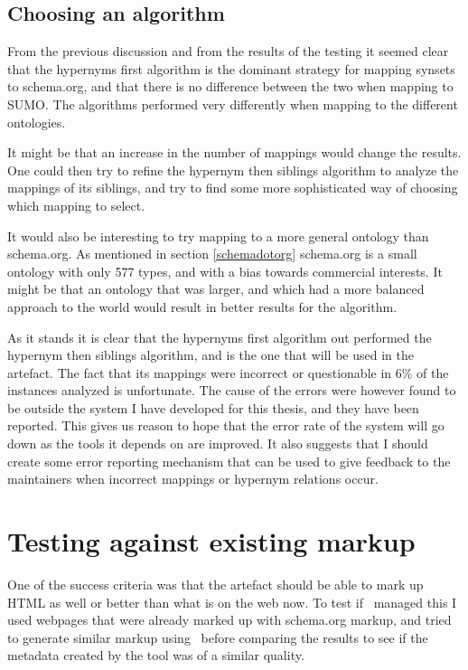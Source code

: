 \subsection{Choosing an algorithm}
From the previous discussion and from the results of the testing it seemed clear that the hypernyms first algorithm is
the dominant strategy for mapping synsets to schema.org, and that there is no difference between the two when mapping to SUMO.
The algorithms performed very differently when mapping to the different ontologies.

It might be that an increase in the number of mappings would change the results.
One could then try to refine the hypernym then siblings algorithm to analyze the mappings of its siblings,
and try to find some more sophisticated way of choosing which mapping to select.

It would also be interesting to try mapping to a more general ontology than schema.org.
As mentioned in section \ref{schemadotorg} schema.org is a small ontology with only 577 types,
and with a bias towards commercial interests.
It might be that an ontology that was larger,
and which had a more balanced approach to the world would result in better results for the algorithm.

As it stands it is clear that the hypernyms first algorithm out performed the hypernym then siblings algorithm,
and is the one that will be used in the artefact.
The fact that its mappings were incorrect or questionable in 6\% of the instances analyzed is unfortunate.
The cause of the errors were however found to be outside the system I have developed for this thesis,
and they have been reported.
This gives us reason to hope that the error rate of the system will go down as the tools it depends on are improved.
It also suggests that I should create some error reporting mechanism that can be used to give feedback to the maintainers
when incorrect mappings or hypernym relations occur.


\section{Testing against existing markup}
One of the success criteria was that the artefact should be able to mark up HTML as well or better than what is on the web now.
To test if \theartefact\ managed this I used webpages that were already marked up with schema.org markup,
and tried to generate similar markup using \theartefact\ before comparing the results to see if the metadata created
by the tool was of a similar quality.

